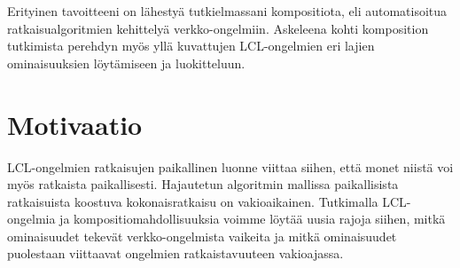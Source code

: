 \documentclass[12pt,finnish]{tktltiki2}
\theoremstyle{definition}
\theoremstyle{remark}
\begin{document}
Erityinen tavoitteeni on lähestyä tutkielmassani kompositiota, eli automatisoitua ratkaisualgoritmien kehittelyä verkko-ongelmiin. Askeleena kohti komposition tutkimista perehdyn myös yllä kuvattujen LCL-ongelmien eri lajien ominaisuuksien löytämiseen ja luokitteluun.

\section{Motivaatio}

LCL-ongelmien ratkaisujen paikallinen luonne viittaa siihen, että monet niistä voi myös ratkaista paikallisesti. Hajautetun algoritmin mallissa paikallisista ratkaisuista koostuva kokonaisratkaisu on vakioaikainen. Tutkimalla LCL-ongelmia ja kompositiomahdollisuuksia voimme löytää uusia rajoja siihen, mitkä ominaisuudet tekevät verkko-ongelmista vaikeita ja mitkä ominaisuudet puolestaan viittaavat ongelmien ratkaistavuuteen vakioajassa.


%
%
% 
%




% 
\end{document}

